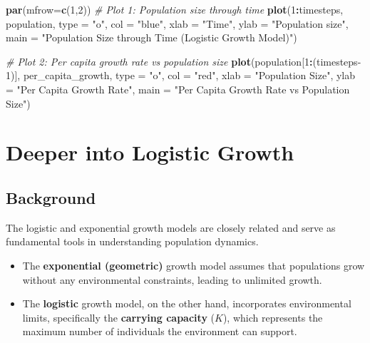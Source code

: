 \documentclass[
  a4paper]{book}
\newenvironment{Shaded}{\begin{snugshade}}{\end{snugshade}}
\newcommand{\AttributeTok}[1]{\textcolor[rgb]{0.13,0.29,0.53}{#1}}
\newcommand{\CommentTok}[1]{\textcolor[rgb]{0.56,0.35,0.01}{\textit{#1}}}
\newcommand{\DecValTok}[1]{\textcolor[rgb]{0.00,0.00,0.81}{#1}}
\newcommand{\FunctionTok}[1]{\textcolor[rgb]{0.13,0.29,0.53}{\textbf{#1}}}
\newcommand{\NormalTok}[1]{#1}
\newcommand{\SpecialCharTok}[1]{\textcolor[rgb]{0.81,0.36,0.00}{\textbf{#1}}}
\newcommand{\StringTok}[1]{\textcolor[rgb]{0.31,0.60,0.02}{#1}}
\providecommand{\tightlist}{%
  \setlength{\itemsep}{0pt}\setlength{\parskip}{0pt}}
\begin{document}
\begin{Shaded}
\begin{Highlighting}[]
\FunctionTok{par}\NormalTok{(}\AttributeTok{mfrow=}\FunctionTok{c}\NormalTok{(}\DecValTok{1}\NormalTok{,}\DecValTok{2}\NormalTok{))}
\CommentTok{\# Plot 1: Population size through time}
\FunctionTok{plot}\NormalTok{(}\DecValTok{1}\SpecialCharTok{:}\NormalTok{timesteps, population, }\AttributeTok{type =} \StringTok{"o"}\NormalTok{, }\AttributeTok{col =} \StringTok{"blue"}\NormalTok{, }\AttributeTok{xlab =} \StringTok{"Time"}\NormalTok{, }\AttributeTok{ylab =} \StringTok{"Population size"}\NormalTok{,}
     \AttributeTok{main =} \StringTok{"Population Size through Time (Logistic Growth Model)"}\NormalTok{)}

\CommentTok{\# Plot 2: Per capita growth rate vs population size}
\FunctionTok{plot}\NormalTok{(population[}\DecValTok{1}\SpecialCharTok{:}\NormalTok{(timesteps}\DecValTok{{-}1}\NormalTok{)], per\_capita\_growth, }\AttributeTok{type =} \StringTok{"o"}\NormalTok{, }\AttributeTok{col =} \StringTok{"red"}\NormalTok{, }
     \AttributeTok{xlab =} \StringTok{"Population Size"}\NormalTok{, }\AttributeTok{ylab =} \StringTok{"Per Capita Growth Rate"}\NormalTok{,}
     \AttributeTok{main =} \StringTok{"Per Capita Growth Rate vs Population Size"}\NormalTok{)}
\end{Highlighting}
\end{Shaded}

\chapter{Deeper into Logistic Growth}\label{deeper-into-logistic-growth}

\section{Background}\label{background-6}

The logistic and exponential growth models are closely related and serve as fundamental tools in understanding population dynamics.

\begin{itemize}
\tightlist
\item
  The \textbf{exponential (geometric)} growth model assumes that populations grow without any environmental constraints, leading to unlimited growth.
\item
  The \textbf{logistic} growth model, on the other hand, incorporates environmental limits, specifically the \textbf{carrying capacity} (\(K\)), which represents the maximum number of individuals the environment can support.
\end{itemize}
\end{document}
